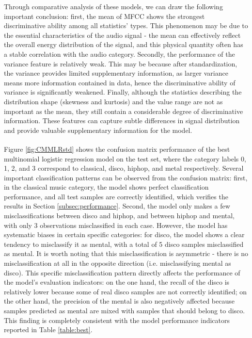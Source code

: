 Through comparative analysis of these models, we can draw the following important conclusion: first, the mean of MFCC shows the strongest discriminative ability among all statistics' types. This phenomenon may be due to the essential characteristics of the audio signal - the mean can effectively reflect the overall energy distribution of the signal, and this physical quantity often has a stable correlation with the audio category. Secondly, the performance of the variance feature is relatively weak. This may be because after standardization, the variance provides limited supplementary information, as larger variance means more information contained in data, hence the discriminative ability of variance is significantly weakened. Finally, although the statistics describing the distribution shape (skewness and kurtosis) and the value range are not as important as the mean, they still contain a considerable degree of discriminative information. These features can capture subtle differences in signal distribution and provide valuable supplementary information for the model.\\
\\
Figure \ref{fig:CMMLRstd} shows the confusion matrix performance of the best multinomial logistic regression model on the test set, where the category labels 0, 1, 2, and 3 correspond to classical, disco, hiphop, and metal respectively. Several important classification patterns can be observed from the confusion matrix: first, in the classical music category, the model shows perfect classification performance, and all test samples are correctly identified, which verifies the results in Section \ref{subsec:performance}. Second, the model only makes a few misclassifications between disco and hiphop, and between hiphop and mental, with only 3 observations misclassified in each case. However, the model has systematic biases in certain specific categories: for disco, the model shows a clear tendency to misclassify it as mental, with a total of 5 disco samples misclassified as mental. It is worth noting that this misclassification is asymmetric - there is no misclassification at all in the opposite direction (i.e. misclassifying mental as disco). This specific misclassification pattern directly affects the performance of the model's evaluation indicators: on the one hand, the recall of the disco is relatively lower because some of real disco samples are not correctly identified; on the other hand, the precision of the mental is also negatively affected because samples predicted as mental are mixed with samples that should belong to disco. This finding is completely consistent with the model performance indicators reported in Table \ref{table:best}.
